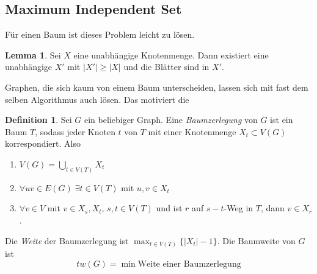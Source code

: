 \documentclass[a4paper, 12pt]{article}
\theoremstyle{plain}
\theoremstyle{definition}
\newtheorem{definition}[theorem]{Definition} %
\theoremstyle{lemma}
\newtheorem{lemma}[theorem]{Lemma}
\theoremstyle{remark}
\theoremstyle{corollary}
\theoremstyle{example}
\begin{document}
	\subsection{Maximum Independent Set}
	Für einen Baum ist dieses Problem leicht zu lösen.
	\begin{lemma}
		Sei $X$ eine unabhängige Knotenmenge. Dann existiert eine unabhängige $X'$ mit $\left|X'\right| \geq \left|X\right|$ und die Blätter sind in $X'$.
	\end{lemma}
	Graphen, die sich kaum von einem Baum unterscheiden, lassen sich mit fast dem selben Algorithmus auch lösen. Das motiviert die 
	\begin{definition}
		Sei $G$ ein beliebiger Graph. Eine \textit{Baumzerlegung} von $G$ ist ein Baum $T$, sodass jeder Knoten $t$ von $T$ mit einer Knotenmenge $X_t \subset V(G)$ korrespondiert. Also \begin{enumerate}
			\item $V(G) = \bigcup_{t \in V(T)} X_t$
			\item $\forall uv \in E(G) \; \exists t \in V(T)$ mit $u,v \in X_t$
			\item $\forall v \in V$ mit $v \in X_s,X_t$, $s,t\in V(T)$ und ist $r$ auf $s-t$-Weg in $T$, dann $v \in X_r$.
		\end{enumerate}
		Die \textit{Weite} der Baumzerlegung ist $\max_{t \in V(T)} \{\left|X_t\right|-1\}$. Die Baumweite von $G$ ist \[tw(G) = \min \text{Weite einer Baumzerlegung}\]
	\end{definition}
\end{document}
